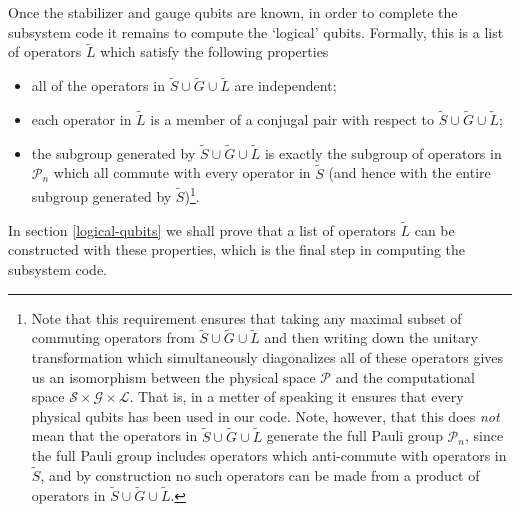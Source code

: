 \documentclass[twocolumn,showpacs,preprintnumbers,amsmath,amssymb,nofootinbib,pra,floatfix]{revtex4}
\begin{document}
Once the stabilizer and gauge qubits are known, in order to complete the subsystem code it remains to compute the `logical' qubits. Formally, this is a list of operators $\tilde L$ which satisfy the following properties
\begin{itemize}
\item all of the operators in $\tilde S \cup \tilde G \cup \tilde L$
  are independent;
\item each operator in $\tilde L$ is a member of a conjugal pair with respect to $\tilde S \cup \tilde G \cup \tilde L$;
\item the subgroup generated by $\tilde S \cup \tilde G \cup \tilde L$ is exactly the subgroup of operators in $\mathcal{P}_n$ which all commute with every operator in $\tilde S$  (and hence with the entire subgroup generated by $\tilde S$)\footnote{Note that this requirement ensures that taking any maximal subset of commuting operators from $\tilde S \cup \tilde G \cup \tilde L$ and then writing down the unitary transformation which simultaneously diagonalizes all of these operators gives us an isomorphism between the physical space $\mathscr{P}$ and the computational space $\mathscr{S}\times\mathscr{G}\times\mathscr{L}$.  That is, in a metter of speaking it ensures that every physical qubits has been used in our code.  Note, however, that this does \emph{not} mean that the operators in $\tilde S \cup \tilde G \cup \tilde L$ generate the full Pauli group $\mathcal{P}_n$, since the full Pauli group includes operators which anti-commute with operators in $\tilde S$, and by construction no such operators can be made from a product of operators in $\tilde S \cup \tilde G \cup \tilde L$.}.
\end{itemize}
In section \ref{logical-qubits} we shall prove that a list of operators $\tilde L$ can be constructed with these properties, which is the final step in computing the subsystem code.
\end{document}
